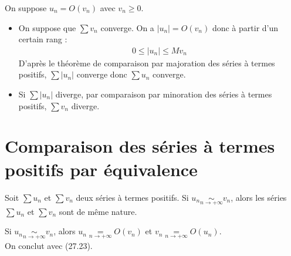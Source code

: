 \documentclass[../main.tex]{subfiles}
\begin{document}
\noindent On suppose $u_n = O(v_n)$ avec $v_n \geq 0$. 
\begin{itemize}
    \item On suppose que $\sum v_n$ converge. On a $|u_n| = O(v_n)$ donc à partir d'un certain rang : 
    \begin{align*}
        0 \leq |u_n| \leq M v_n
    \end{align*}
    D'après le théorème de comparaison par majoration des séries à termes positifs, $\sum |u_n|$ converge donc $\sum u_n$ converge.

    \item Si $\sum |u_n|$ diverge, par comparaison par minoration des séries à termes positifs, $\sum v_n$ diverge. 
\end{itemize}

\section{Comparaison des séries à termes positifs par équivalence}
\begin{tcolorbox}[title=Théorème 27.24, title filled=false, colframe=orange, colback=orange!10!white]
    Soit $\sum u_n$ et $\sum v_n$ deux séries à termes positifs. Si $u_n \underset{n\to +\infty}{\sim} v_n$, alors les séries $\sum u_n$ et $\sum v_n$ sont de même nature.
\end{tcolorbox}

\noindent Si $u_n \underset{n\to +\infty}{\sim} v_n$, alors $u_n \underset{n\to +\infty}{=} O(v_n)$ et $v_n \underset{n\to +\infty}{=} O(u_n)$. \\
On conclut avec (27.23). 
\end{document}
